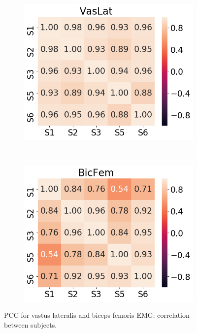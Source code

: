 \begin{figure}[!htb]
     \centering
     \begin{subfigure}[b]{0.45\textwidth}
         \centering
         \includegraphics[width=\textwidth]{img/results/correlations/VasLat_correlation_between_subjects.png}
     \end{subfigure}
     ~
     \begin{subfigure}[b]{0.45\textwidth}
         \centering
         \includegraphics[width=\textwidth]{img/results/correlations/BicFem_correlation_between_subjects.png}
     \end{subfigure}
    \caption{\ac{PCC} for vastus lateralis and biceps femoris \ac{EMG}: correlation between subjects.}
    \label{fig:A-vaslat-and-bicfem-correlation}
\end{figure}
